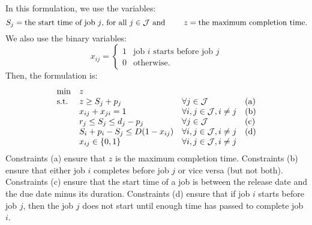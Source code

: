 \documentclass[10pt]{article}
\begin{document}
\bigskip
\noindent
In this formulation, we use the variables:
    \[
    S_j = \mbox{the start time of job $j$, for all $j \in {\cal J}$ and } \quad \quad
    z = \mbox{the maximum completion time}.
    \]
    We also use the binary variables:
    \[
    x_{ij} = \left\{
      \begin{array}{ll}
        1 & \mbox{job $i$ starts before job $j$} \\
        0 & \mbox{otherwise}.
      \end{array}
      \right.
    \]
    Then, the formulation is:
    \[
    \begin{array}{llll}
      \min & z & & \\
      \mbox{s.t.}
      & z \geq S_j + p_j & \forall j \in {\cal J} & \mbox{(a)} \\
      & x_{ij} + x_{ji} = 1 & \forall i,j \in {\cal J}, i \ne j & \mbox{(b)} \\
      & r_j \leq S_j \leq d_j - p_j & \forall j \in {\cal J} & \mbox{(c)} \\
      & S_i + p_i - S_j \leq D(1-x_{ij}) & \forall i,j \in {\cal J}, i \ne j & \mbox{(d)} \\
      & x_{ij} \in \{0,1\} & \forall i,j \in {\cal J}, i \ne j & 
    \end{array}
    \]
    Constraints (a) ensure that $z$ is the maximum completion
    time. Constraints (b) ensure that either job $i$ completes before
    job $j$ or vice versa (but not both). Constraints (c) ensure that
    the start time of a job is between the release date and the due date minus its duration. Constraints (d) ensure that if job $i$
    starts before job $j$, then the job $j$ does not start until
    enough time has passed to complete job $i$.
\end{document}
